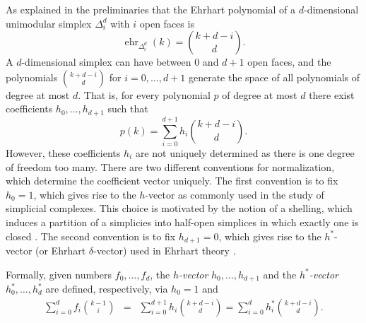 \documentclass[12pt,reqno]{amsart}
\numberwithin{definition}{section}
\theoremstyle{definition}
\newcommand{\ehr}{\operatorname{ehr}}
\begin{document}
As explained in the preliminaries that the Ehrhart polynomial of a $d$-dimensional unimodular simplex $\Delta^d_i$ with $i$ open faces is
\[
  \ehr_{\Delta^d_i}(k) = \binom{k+d-i}{d}.
\]
A $d$-dimensional simplex can have between 0 and $d+1$ open faces, and the polynomials $\binom{k+d-i}{d}$ for $i=0,\ldots,d+1$ generate the space of all polynomials of degree at most $d$. That is, for every polynomial $p$ of degree at most $d$ there exist coefficients $h_0,\ldots,h_{d+1}$ such that
\[
  p(k) = \sum_{i=0}^{d+1} h_i \binom{k+d-i}{d}.
\] 
However, these coefficients $h_i$ are not uniquely determined as there is one degree of freedom too many. There are two different conventions for normalization, which determine the coefficient vector uniquely. The first convention is to fix $h_0=1$, which gives rise to the $h$-vector as commonly used in the study of simplicial complexes. This choice is motivated by the notion of a shelling, which induces a partition of a simplicies into half-open simplices in which exactly one is closed \cite{Ziegler1995}. The second convention is to fix $h_{d+1}=0$, which gives rise to the $h^*$-vector (or Ehrhart $\delta$-vector) used in Ehrhart theory \cite{Beck2007}.

Formally, given numbers $f_0,\ldots,f_d$, the \emph{$h$-vector} $h_0,\ldots,h_{d+1}$ and the \emph{$h^*$-vector} $h^*_0,\ldots,h^*_{d}$ are defined, respectively, via $h_0=1$ and
\begin{eqnarray*}
  \sum_{i=0}^{d} f_i \binom{k-1}{i} & = &
  \sum_{i=0}^{d+1} h_i \binom{k+d-i}{d} 
  = \sum_{i=0}^{d} h^*_i \binom{k+d-i}{d}. 
\end{eqnarray*}


\end{document}
